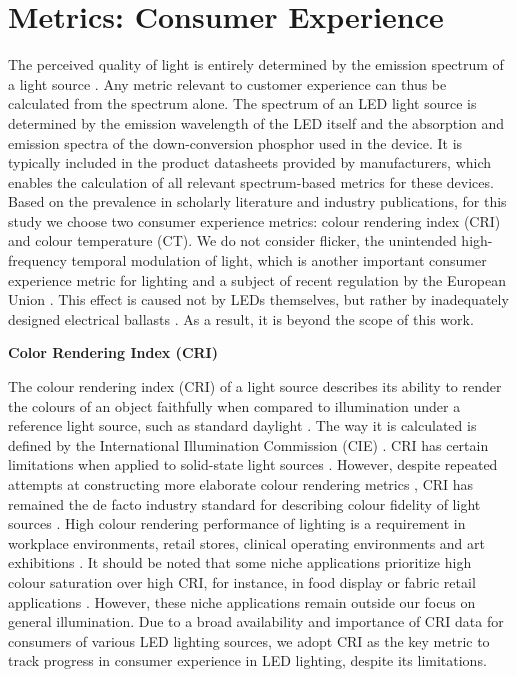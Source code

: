 \documentclass[parskip=full]{article}
\begin{document}
\clearpage
\section{Metrics: Consumer Experience}
\label{sec:metrics_consumer}

The perceived quality of light is entirely determined by the emission spectrum of a light source \cite{ies_handbook}. Any metric relevant to customer experience can thus be calculated from the spectrum alone. The spectrum of an LED light source is determined by the emission wavelength of the LED itself and the absorption and emission spectra of the down-conversion phosphor used in the device. It is typically included in the product datasheets provided by manufacturers, which enables the calculation of all relevant spectrum-based metrics for these devices. Based on the prevalence in scholarly literature and industry publications, for this study we choose two consumer experience metrics: colour rendering index (CRI) and colour temperature (CT). We do not consider flicker, the unintended high-frequency temporal modulation of light, which is another important consumer experience metric for lighting and a subject of recent regulation by the European Union \cite{weinold2020long}. This effect is caused not by LEDs themselves, but rather by inadequately designed electrical ballasts \cite{Lehman2014}. As a result, it is beyond the scope of this work. 

\textbf{Color Rendering Index (CRI)}

The colour rendering index (CRI) of a light source describes its ability to render the colours of an object faithfully when compared to illumination under a reference light source, such as standard daylight \cite{khan2015led}. The way it is calculated is defined by the International Illumination Commission (CIE) \cite{cie_cri_1995}. CRI has certain limitations when applied to solid-state light sources \cite{david2013cri}. However, despite repeated attempts at constructing more elaborate colour rendering metrics \cite{Houser2013}, CRI has remained the de facto industry standard for describing colour fidelity of light sources \cite{DoE2016LED}. High colour rendering performance of lighting is a requirement in workplace environments, retail stores, clinical operating environments and art exhibitions \cite{khanh2017color}. It should be noted that some niche applications prioritize high colour saturation over high CRI, for instance, in food display or fabric retail applications \cite{david2013cri}. However, these niche applications remain outside our focus on general illumination. Due to a broad availability and importance of CRI data for consumers of various LED lighting sources, we adopt CRI as the key metric to track progress in consumer experience in LED lighting, despite its limitations.
\end{document}
